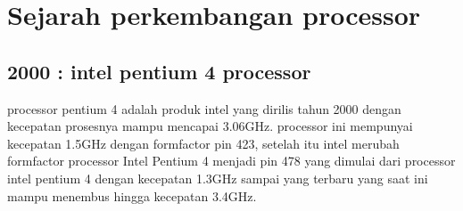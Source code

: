 \section{Sejarah perkembangan processor}
	\subsection{2000 : intel pentium 4 processor}
	processor pentium 4 adalah produk intel yang dirilis tahun 2000 dengan kecepatan prosesnya mampu mencapai 3.06GHz. processor ini mempunyai kecepatan 1.5GHz dengan formfactor pin 423, setelah itu intel merubah formfactor processor Intel Pentium 4 menjadi pin 478 yang dimulai dari processor intel pentium 4 dengan kecepatan 1.3GHz sampai yang terbaru yang saat ini mampu menembus hingga kecepatan 3.4GHz.